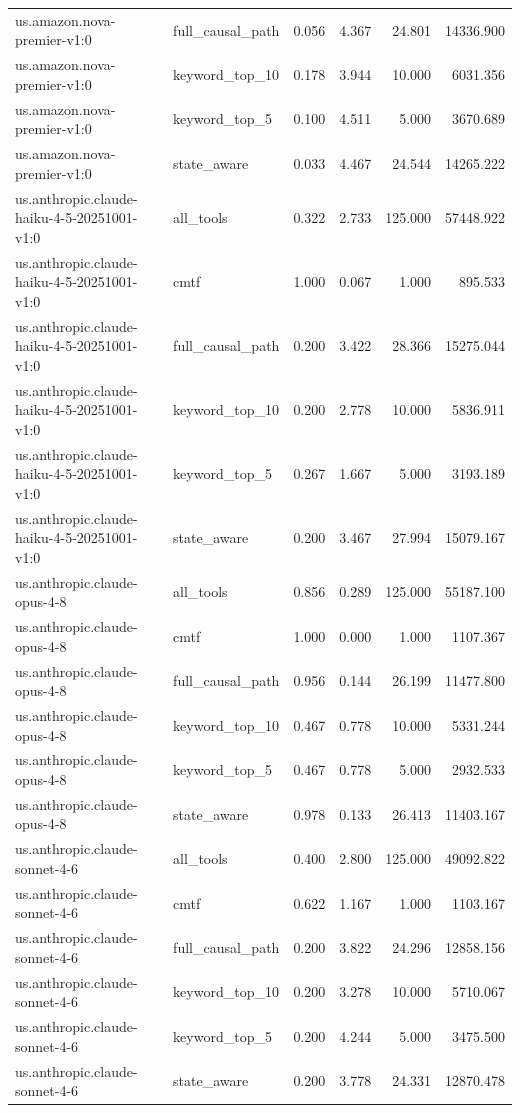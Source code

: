 \begin{tabular}{llrrrr}
us.amazon.nova-premier-v1:0 & full_causal_path & 0.056 & 4.367 & 24.801 & 14336.900 \\
us.amazon.nova-premier-v1:0 & keyword_top_10 & 0.178 & 3.944 & 10.000 & 6031.356 \\
us.amazon.nova-premier-v1:0 & keyword_top_5 & 0.100 & 4.511 & 5.000 & 3670.689 \\
us.amazon.nova-premier-v1:0 & state_aware & 0.033 & 4.467 & 24.544 & 14265.222 \\
us.anthropic.claude-haiku-4-5-20251001-v1:0 & all_tools & 0.322 & 2.733 & 125.000 & 57448.922 \\
us.anthropic.claude-haiku-4-5-20251001-v1:0 & cmtf & 1.000 & 0.067 & 1.000 & 895.533 \\
us.anthropic.claude-haiku-4-5-20251001-v1:0 & full_causal_path & 0.200 & 3.422 & 28.366 & 15275.044 \\
us.anthropic.claude-haiku-4-5-20251001-v1:0 & keyword_top_10 & 0.200 & 2.778 & 10.000 & 5836.911 \\
us.anthropic.claude-haiku-4-5-20251001-v1:0 & keyword_top_5 & 0.267 & 1.667 & 5.000 & 3193.189 \\
us.anthropic.claude-haiku-4-5-20251001-v1:0 & state_aware & 0.200 & 3.467 & 27.994 & 15079.167 \\
us.anthropic.claude-opus-4-8 & all_tools & 0.856 & 0.289 & 125.000 & 55187.100 \\
us.anthropic.claude-opus-4-8 & cmtf & 1.000 & 0.000 & 1.000 & 1107.367 \\
us.anthropic.claude-opus-4-8 & full_causal_path & 0.956 & 0.144 & 26.199 & 11477.800 \\
us.anthropic.claude-opus-4-8 & keyword_top_10 & 0.467 & 0.778 & 10.000 & 5331.244 \\
us.anthropic.claude-opus-4-8 & keyword_top_5 & 0.467 & 0.778 & 5.000 & 2932.533 \\
us.anthropic.claude-opus-4-8 & state_aware & 0.978 & 0.133 & 26.413 & 11403.167 \\
us.anthropic.claude-sonnet-4-6 & all_tools & 0.400 & 2.800 & 125.000 & 49092.822 \\
us.anthropic.claude-sonnet-4-6 & cmtf & 0.622 & 1.167 & 1.000 & 1103.167 \\
us.anthropic.claude-sonnet-4-6 & full_causal_path & 0.200 & 3.822 & 24.296 & 12858.156 \\
us.anthropic.claude-sonnet-4-6 & keyword_top_10 & 0.200 & 3.278 & 10.000 & 5710.067 \\
us.anthropic.claude-sonnet-4-6 & keyword_top_5 & 0.200 & 4.244 & 5.000 & 3475.500 \\
us.anthropic.claude-sonnet-4-6 & state_aware & 0.200 & 3.778 & 24.331 & 12870.478 \\
\bottomrule
\end{tabular}
